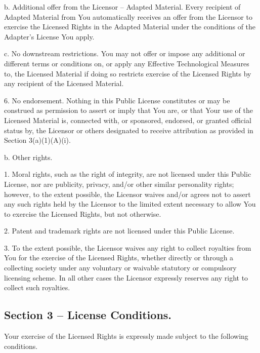 \begin{DoxyVerb}
      b. Additional offer from the Licensor -- Adapted Material.
         Every recipient of Adapted Material from You
         automatically receives an offer from the Licensor to
         exercise the Licensed Rights in the Adapted Material
         under the conditions of the Adapter's License You apply.

      c. No downstream restrictions. You may not offer or impose
         any additional or different terms or conditions on, or
         apply any Effective Technological Measures to, the
         Licensed Material if doing so restricts exercise of the
         Licensed Rights by any recipient of the Licensed
         Material.

 6. No endorsement. Nothing in this Public License constitutes or
    may be construed as permission to assert or imply that You
    are, or that Your use of the Licensed Material is, connected
    with, or sponsored, endorsed, or granted official status by,
    the Licensor or others designated to receive attribution as
    provided in Section 3(a)(1)(A)(i).
\end{DoxyVerb}


b. Other rights. \begin{DoxyVerb} 1. Moral rights, such as the right of integrity, are not
    licensed under this Public License, nor are publicity,
    privacy, and/or other similar personality rights; however, to
    the extent possible, the Licensor waives and/or agrees not to
    assert any such rights held by the Licensor to the limited
    extent necessary to allow You to exercise the Licensed
    Rights, but not otherwise.

 2. Patent and trademark rights are not licensed under this
    Public License.

 3. To the extent possible, the Licensor waives any right to
    collect royalties from You for the exercise of the Licensed
    Rights, whether directly or through a collecting society
    under any voluntary or waivable statutory or compulsory
    licensing scheme. In all other cases the Licensor expressly
    reserves any right to collect such royalties.
\end{DoxyVerb}


\subsection*{Section 3 -- License Conditions.}

Your exercise of the Licensed Rights is expressly made subject to the following conditions.

